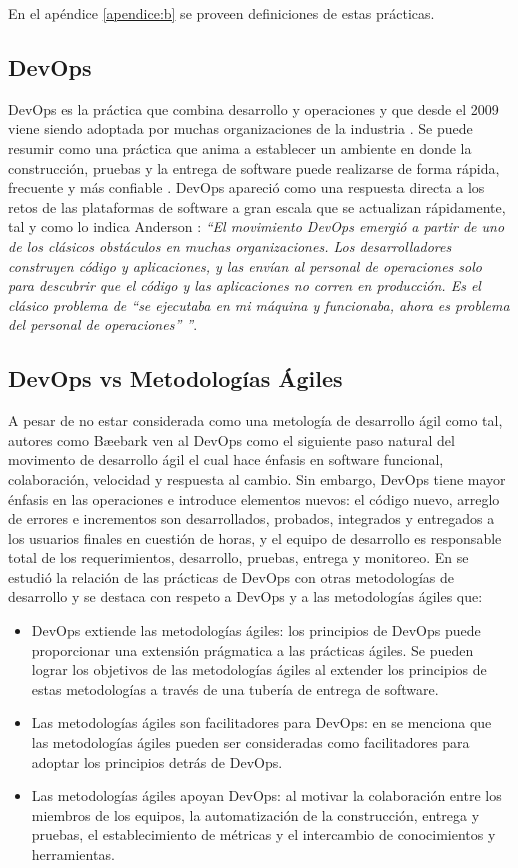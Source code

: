 En el apéndice \ref{apendice:b} se proveen definiciones de estas prácticas.

\subsection{DevOps}
DevOps es la práctica que combina desarrollo y operaciones y que desde el 2009 viene siendo adoptada por muchas organizaciones de la industria \cite{bang-et-al}. Se puede resumir como una práctica que anima a establecer un ambiente en donde la construcción, pruebas y la entrega de software puede realizarse de forma rápida, frecuente y más confiable \cite{henrik-b}. DevOps apareció como una respuesta directa a los retos de las plataformas de software a gran escala que se actualizan rápidamente, tal y como lo indica Anderson \cite{anderson}: \emph{``El movimiento DevOps emergió a partir de uno de los clásicos obstáculos en muchas organizaciones. Los desarrolladores construyen código y aplicaciones, y las envían al personal de operaciones solo para descubrir que el código y las aplicaciones no corren en producción. Es el clásico problema de ``se ejecutaba en mi máquina y funcionaba, ahora es problema del personal de operaciones'' ''}. 

\subsection{DevOps vs Metodologías Ágiles} \label{sec:devops-vs-agile}
A pesar de no estar considerada como una metología de desarrollo ágil como tal, autores como Bæebark \cite{henrik-b} ven al DevOps como el siguiente paso natural del movimento de desarrollo ágil el cual hace énfasis en software funcional, colaboración, velocidad y respuesta al cambio. Sin embargo, DevOps tiene mayor énfasis en las operaciones e introduce elementos nuevos: el código nuevo, arreglo de errores e incrementos son desarrollados, probados, integrados y entregados a los usuarios finales en cuestión de horas, y el equipo de desarrollo es responsable total de los requerimientos, desarrollo, pruebas, entrega y monitoreo. En \cite{jabbari-et-al} se estudió la relación de las prácticas de DevOps con otras metodologías de desarrollo y se destaca con respeto a DevOps y a las metodologías ágiles que:
\begin{itemize}
    \item DevOps extiende las metodologías ágiles: los principios de DevOps puede proporcionar una extensión prágmatica a las prácticas ágiles. Se pueden lograr los objetivos de las metodologías ágiles al extender los principios de estas metodologías a través de una tubería de entrega de software.
    \item Las metodologías ágiles son facilitadores para DevOps: en \cite{jabbari-et-al} se menciona que las metodologías ágiles pueden ser consideradas como facilitadores para adoptar los principios detrás de DevOps.
    \item Las metodologías ágiles apoyan DevOps: al motivar la colaboración entre los miembros de los equipos, la automatización de la construcción, entrega y pruebas, el establecimiento de métricas y el intercambio de conocimientos y herramientas. 
\end{itemize}

